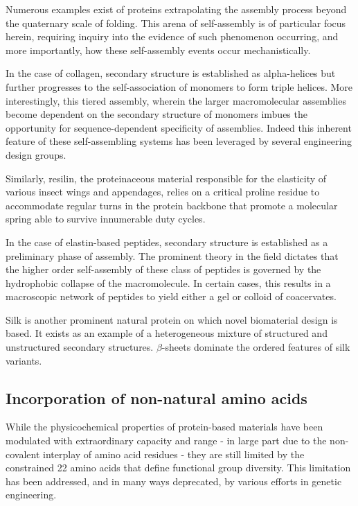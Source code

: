 \begin{refsection}
Numerous examples exist of proteins extrapolating the assembly process beyond
the quaternary scale of folding. This arena of self-assembly is of particular
focus herein, requiring inquiry into the evidence of such phenomenon occurring,
and more importantly, how these self-assembly events occur mechanistically.

In the case of collagen, secondary structure is established as alpha-helices but
further progresses to the self-association of monomers to form triple helices.
More interestingly, this tiered assembly, wherein the larger macromolecular
assemblies become dependent on the secondary structure of monomers imbues the
opportunity for sequence-dependent specificity of assemblies. Indeed this
inherent feature of these self-assembling systems has been leveraged by several
engineering design groups.\cite{}

Similarly, resilin, the proteinaceous material responsible for the elasticity of
various insect wings and appendages, relies on a critical proline residue to
accommodate regular turns in the protein backbone that promote a molecular
spring able to survive innumerable duty cycles.\cite{}

In the case of elastin-based peptides, secondary structure is established as a
preliminary phase of assembly. The prominent theory in the field dictates that
the higher order self-assembly of these class of peptides is governed by the
hydrophobic collapse of the macromolecule. In certain cases, this results in a
macroscopic network of peptides to yield either a gel or colloid of
coacervates.\cite{}

Silk is another prominent natural protein on which novel biomaterial design is
based. It exists as an example of a heterogeneous mixture of structured and
unstructured secondary structures.  $\beta$-sheets dominate the ordered features
of silk variants.

\subsection{Incorporation of non-natural amino acids}

While the physicochemical properties of protein-based materials have been
modulated with extraordinary capacity and range\cite{} - in large part due to
the non-covalent interplay of amino acid residues - they are still limited by
the constrained 22 amino acids that define functional group diversity.\cite{}
This limitation has been addressed, and in many ways deprecated, by various
efforts in genetic engineering.\cite{} 


\end{refsection}
